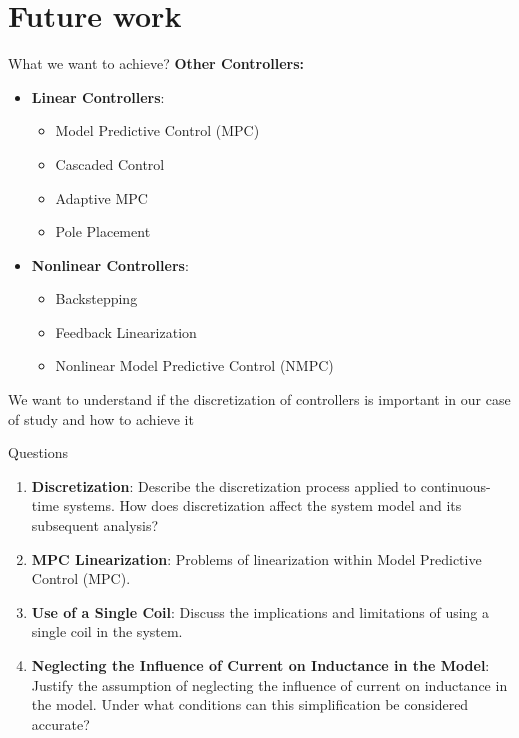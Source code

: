 \section{Future work}

\begin{frame}{What we want to achieve?}
\textbf{Other Controllers:}
\begin{itemize}
    \item \textbf{Linear Controllers}:
    \begin{itemize}
        \item Model Predictive Control (MPC)
        \item Cascaded Control
        \item Adaptive MPC
        \item Pole Placement
    \end{itemize}

    \item \textbf{Nonlinear Controllers}:
    \begin{itemize}
        \item Backstepping
        \item Feedback Linearization
        \item Nonlinear Model Predictive Control (NMPC)
    \end{itemize}
\end{itemize}

We want to understand if the discretization of controllers is important in our case of study and how to achieve it

\end{frame}

\begin{frame}{Questions}
\begin{enumerate}
    \item \textbf{Discretization}: Describe the discretization process applied to continuous-time systems. How does discretization affect the system model and its subsequent analysis?

    \item \textbf{MPC Linearization}: Problems of linearization within Model Predictive Control (MPC).
    
    \item \textbf{Use of a Single Coil}: Discuss the implications and limitations of using a single coil in the system.

    \item \textbf{Neglecting the Influence of Current on Inductance in the Model}: Justify the assumption of neglecting the influence of current on inductance in the model. Under what conditions can this simplification be considered accurate?

\end{enumerate}
\end{frame}
